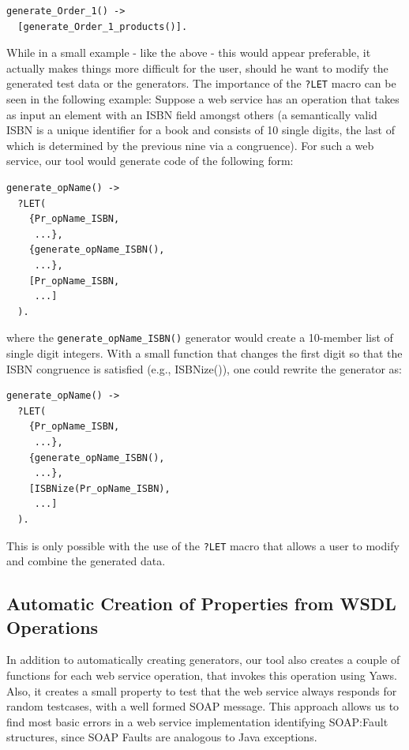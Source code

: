 \documentclass[submission,copyright]{eptcs}
\newcommand{\LET}{\texttt{?LET}\xspace}
\begin{document}
\begin{lstlisting}
generate_Order_1() ->
  [generate_Order_1_products()].
\end{lstlisting}

While in a small example - like the above - this would appear preferable, it actually makes things more 
difficult for the user, should he want to modify the generated test data or the generators. 
The importance of the \LET macro can be seen in the following example: Suppose a web service 
has an operation that takes as input an element with an ISBN field amongst others (a 
semantically valid ISBN is a unique identifier for a book and consists of 10 single digits, 
the last of which is determined by the previous nine via a congruence). For such a web service, 
our tool would generate code of the following form:
\begin{lstlisting}
generate_opName() ->
  ?LET(
    {Pr_opName_ISBN,
     ...},
    {generate_opName_ISBN(),
     ...},
    [Pr_opName_ISBN,
     ...]
  ).
\end{lstlisting}
where the \texttt{generate\_opName\_ISBN()} generator would create a
10-member list of single digit integers. With a small function that
changes the first digit so that the ISBN congruence is satisfied (e.g.,
ISBNize()), one could rewrite the generator as:
\begin{lstlisting}
generate_opName() ->
  ?LET(
    {Pr_opName_ISBN,
     ...},
    {generate_opName_ISBN(),
     ...},
    [ISBNize(Pr_opName_ISBN),
     ...]
  ).
\end{lstlisting}

This is only possible with the use of the \LET macro that allows a user to
modify and combine the generated data. 

\subsection{Automatic Creation of Properties from WSDL Operations}

In addition to automatically creating generators, our tool also
creates a couple of functions for each web service operation, that
invokes this operation using Yaws. Also, it creates a small property
to test that the web service always responds for random testcases, with a
well formed SOAP message. This approach allows us to find most basic
errors in a web service implementation identifying SOAP:Fault
structures, since SOAP Faults are analogous to Java exceptions.
\end{document}
